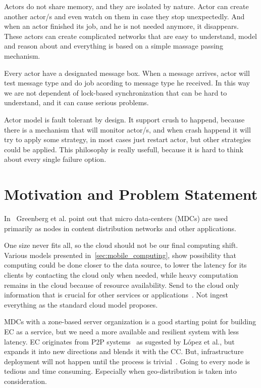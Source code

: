 Actors do not share memory, and they are isolated by nature. Actor can create another actor/s and even watch on them in case they stop unexpectedly. And when an actor finished its job, and he is not needed anymore, it disappears. These actors can create complicated networks that are easy to understand, model and reason about and everything is based on a simple massage passing mechanism. 

Every actor have a designated message box. When a message arrives, actor will test message type and do job acording to message type he received. In this way we are not dependent of lock-based synchronization that can be hard to understand, and it can cause serious problems.

Actor model is fault tolerant by design. It support crush to happend, because there is a  mechanism that will monitor actor/s, and when crash happend it will try to apply some strategy, in most cases just restart actor, but other strategies could be applied. This philosophy is really usefull, because it is hard to think about every single failure option.
%
%
\section{Motivation and Problem Statement}\label{sec:problem_statement}
%
In~\cite{GreenbergHMP09} Greenberg et al. point out that micro data-centers (MDCs) are used primarily as nodes in content distribution networks and other  applications.

One size never fits all, so the cloud should not be our final computing shift. Various models presented in~\ref{sec:mobile_computing}, show possibility that computing could be done closer to the data source, to lower the latency for its clients by contacting the cloud only when needed, while heavy computation remains in the cloud because of resource availability. Send to the cloud only information that is crucial for other services or applications~\cite{inproceedingsSimic1}. Not ingest everything as the standard cloud model proposes.

MDCs with a zone-based server organization is a good starting point for building EC as a service, but we need a more available and resilient system with less latency. EC originates from P2P systems~\cite{LopezMEDHIBFR15} as sugested by L{\'{o}}pez et al., but expands it into new directions and blends it with the CC. But, infrastructure deployment will not happen until the process is trivial~\cite{SatyanarayananBCD09}. Going to every node is tedious and time consuming. Especially when geo-distribution is taken into consideration.

